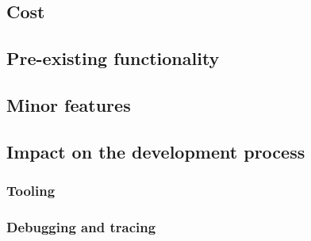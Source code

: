 \subsection{Cost}
\subsection{Pre-existing functionality}
\subsection{Minor features}
\subsection{Impact on the development process}
\subsubsection{Tooling}
\subsubsection{Debugging and tracing}